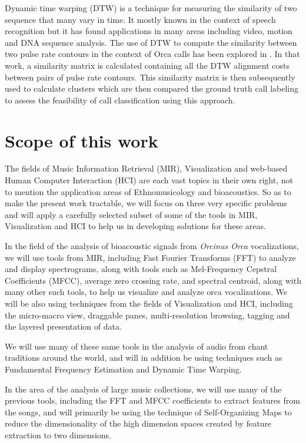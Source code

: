 \documentclass[12pt,oneside]{book}
\begin{document}
Dynamic time warping (DTW) is a technique for measuring the similarity
of two sequence that many vary in time. It mostly known in the context
of speech recognition \cite{sakoe78} but it has found applications in
many areas including video, motion and DNA sequence analysis. The use
of DTW to compute the similarity between two pulse rate contours in
the context of Orca calls has been explored in
\cite{brown07_orca_dtw}. In that work, a similarity matrix is
calculated containing all the DTW alignment costs between pairs of
pulse rate contours. This similarity matrix is then subsequently used
to calculate clusters which are then compared the ground truth call
labeling to assess the feasibility of call classification using this
approach.

\section{Scope of this work}
\label{section:introduction:scopeOfThisWork}

The fields of Music Information Retrieval (MIR), Visualization and
web-based Human Computer Interaction (HCI) are each vast topics in
their own right, not to mention the application areas of
Ethnomusicology and bioacoustics.  So as to make the present work
tractable, we will focus on three very specific problems and will
apply a carefully selected subset of some of the tools in MIR,
Visualization and HCI to help us in developing solutions for these
areas.

In the field of the analysis of bioacoustic signals from
\textit{Orcinus Orca} vocalizations, we will use tools from MIR,
including Fast Fourier Transforms (FFT) to analyze and display
spectrograms, along with tools such as Mel-Frequency Cepstral
Coefficients (MFCC), average zero crossing rate, and spectral
centroid, along with many other such tools, to help us visualize and
analyze orca vocalizations.  We will be also using techniques from the
fields of Visualization and HCI, including the micro-macro view,
draggable panes, multi-resolution browsing, tagging and the layered
presentation of data.

We will use many of these same tools in the analysis of audio from
chant traditions around the world, and will in addition be using
techniques such as Fundamental Frequency Estimation and Dynamic Time
Warping.

In the area of the analysis of large music collections, we will use
many of the previous tools, including the FFT and MFCC coefficients to
extract features from the songs, and will primarily be using the
technique of Self-Organizing Maps to reduce the dimensionality of the
high dimension spaces created by feature extraction to two dimensions.
\end{document}
